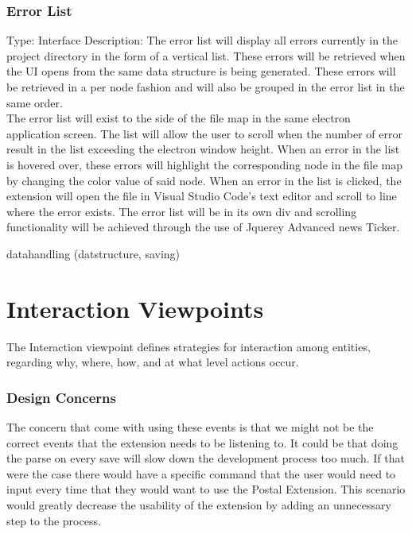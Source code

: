 \documentclass[letterpaper,10pt,titlepage,draftclsnofoot,onecolumn,onesided] {IEEEtran}
\begin{document}
	\subsubsection {Error List}
	Type: Interface
	Description: 
	The error list will display all errors currently in the project directory in the form of a vertical list. 
	These errors will be retrieved when the UI opens from the same data structure is being generated. 
	These errors will be retrieved in a per node fashion and will also be grouped in the error list in the same order. 
	\\
	The error list will exist to the side of the file map in the same electron application screen. 
	The list will allow the user to scroll when the number of error result in the list exceeding the electron window height. 
	When an error in the list is hovered over, these errors will highlight the corresponding node in the file map by changing the color value of said node. 
	When an error in the list is clicked, the extension will open the file in Visual Studio Code's text editor and scroll to line where the error exists.
	The error list will be in its own div and scrolling functionality will be achieved through the use of Jquerey Advanced news Ticker.

	
	
	

	datahandling (datstructure, saving)







\section{Interaction Viewpoints}
The Interaction viewpoint defines strategies for interaction among entities, regarding why, where, how, and
at what level actions occur. 
\subsubsection{Design Concerns}
The concern that come with using these events is that we might not be the correct events that the extension needs to be listening to. 
It could be that doing the parse on every save will slow down the development process too much. 
If that were the case there would have a specific command that the user would need to input every time that they would want to use the Postal Extension.
This scenario would greatly decrease the usability of the extension by adding an unnecessary step to the process.
\end{document}
